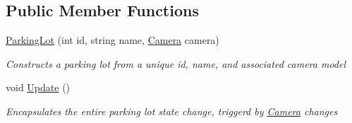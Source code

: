 \subsection*{Public Member Functions}
\begin{DoxyCompactItemize}
\item 
\mbox{\hyperlink{class_eagle_eye_1_1_models_1_1_parking_lot_a02ac70305c0a604f9123ccdb0aa5d323}{Parking\+Lot}} (int id, string name, \mbox{\hyperlink{class_eagle_eye_1_1_models_1_1_camera}{Camera}} camera)
\begin{DoxyCompactList}\small\item\em Constructs a parking lot from a unique id, name, and associated camera model \end{DoxyCompactList}\item 
void \mbox{\hyperlink{class_eagle_eye_1_1_models_1_1_parking_lot_a7e3c86f8ba1c0de2e4d0a2ec7d14a653}{Update}} ()
\begin{DoxyCompactList}\small\item\em Encapsulates the entire parking lot state change, triggerd by \mbox{\hyperlink{class_eagle_eye_1_1_models_1_1_camera}{Camera}} changes \end{DoxyCompactList}\end{DoxyCompactItemize}
